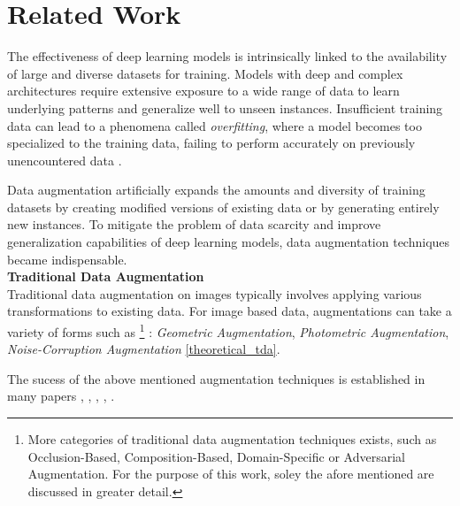 \section{Related Work}\label{related_work}


The effectiveness of deep learning models is intrinsically linked to the availability of large and diverse datasets for training. Models with deep and complex architectures require extensive exposure to a wide range of data to learn underlying patterns and generalize well to unseen instances. Insufficient training data can lead to a phenomena called \textit{overfitting}, where a model becomes too specialized to the training data, failing to perform accurately on previously unencountered data \cite{Ying2019overfittinganditssolutions}.

Data augmentation artificially expands the amounts and diversity of training datasets by creating modified versions of existing data or by generating entirely new instances. To mitigate the problem of data scarcity and improve generalization capabilities of deep learning models, data augmentation techniques became indispensable. \\

\noindent\textbf{Traditional Data Augmentation}\label{traditional_data_augmentation} \\
Traditional data augmentation on images typically involves applying various transformations to existing data. For image based data, augmentations can take a variety of forms such as
\footnote{More categories of traditional data augmentation techniques exists, such as Occlusion-Based, Composition-Based, Domain-Specific or Adversarial Augmentation. For the purpose of this work,  soley the afore mentioned are discussed in greater detail.}
: \textit{Geometric Augmentation}, \textit{Photometric Augmentation}, \textit{Noise-Corruption Augmentation} \ref{theoretical_tda}.

\noindent 
The sucess of the above mentioned augmentation techniques is established in many papers \cite{perez2017effectivenessdataaugmentationimage}, \cite{NIPS2012_c399862d}, \cite{Ying2019overfittinganditssolutions}, \cite{shorten2019survey}, \cite{WanLiZeiler2013}.\\



